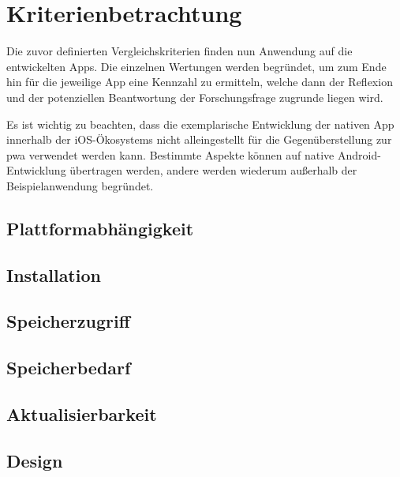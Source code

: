 \section{Kriterienbetrachtung}

Die zuvor definierten Vergleichskriterien finden nun Anwendung auf die entwickelten Apps. Die einzelnen Wertungen werden begründet, um zum Ende hin für die jeweilige App eine Kennzahl zu ermitteln, welche dann der Reflexion und der potenziellen Beantwortung der Forschungsfrage zugrunde liegen wird.

Es ist wichtig zu beachten, dass die exemplarische Entwicklung der nativen App innerhalb der iOS-Ökosystems nicht alleingestellt für die Gegenüberstellung zur \ac{pwa} verwendet werden kann. Bestimmte Aspekte können auf native Android-Entwicklung übertragen werden, andere werden wiederum außerhalb der Beispielanwendung begründet.

\subsection{Plattformabhängigkeit} \label{sec:6-plattform}


\subsection{Installation} \label{sec:6-installation}


\subsection{Speicherzugriff} \label{sec:6-speicherzugriff}


\subsection{Speicherbedarf} \label{sec:6-speicherbedarf}


\subsection{Aktualisierbarkeit} \label{sec:6-aktualisierbarkeit}


\subsection{Design} \label{sec:6-konsistenz-des-designs}


